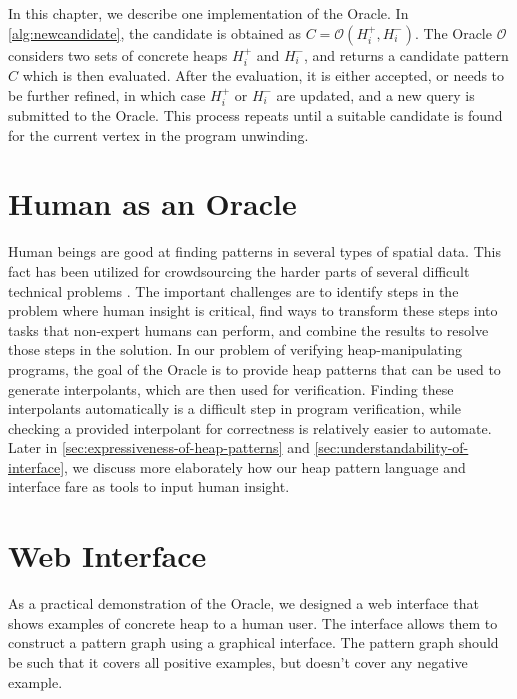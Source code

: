 \label{ch:interface-oracle}

In this chapter, we describe one implementation of the Oracle. In
\autoref{alg:newcandidate}, the candidate is obtained as
$C = \mathcal{O}(H_i^{+}, H_i^{-})$. The Oracle $\mathcal{O}$ considers two sets of
concrete heaps $H_i^{+}$ and $H_i^{-}$, and returns a candidate pattern $C$ which is
then evaluated. After the evaluation, it is either accepted, or needs to be further
refined, in which case $H_i^{+}$ or $H_i^{-}$ are updated, and a new query is submitted
to the Oracle. This process repeats until a suitable candidate is found for the current
vertex in the program unwinding.

\section{Human as an Oracle}
Human beings are good at finding patterns in several types of spatial data. This fact
has been utilized for crowdsourcing the harder parts of several difficult technical
problems \cite{wenchao2012, verigames, eyewire}. The important challenges are to
identify steps in the problem where human insight is critical, find ways to transform
these steps into tasks that non-expert humans can perform, and combine the results to
resolve those steps in the solution. In our problem of verifying heap-manipulating
programs, the goal of the Oracle is to provide heap patterns that can be used to
generate interpolants, which are then used for verification. Finding these interpolants
automatically is a difficult step in program verification, while checking a provided
interpolant for correctness is relatively easier to automate. Later in
\autoref{sec:expressiveness-of-heap-patterns} and
\autoref{sec:understandability-of-interface}, we discuss more elaborately how our heap
pattern language and interface fare as tools to input human insight.

\section{Web Interface}
\label{sec:web-interface}
As a practical demonstration of the Oracle, we designed a web interface that shows
examples of concrete heap to a human user. The interface allows them to construct a
pattern graph using a graphical interface. The pattern graph should be such that it
covers all positive examples, but doesn't cover any negative example.


